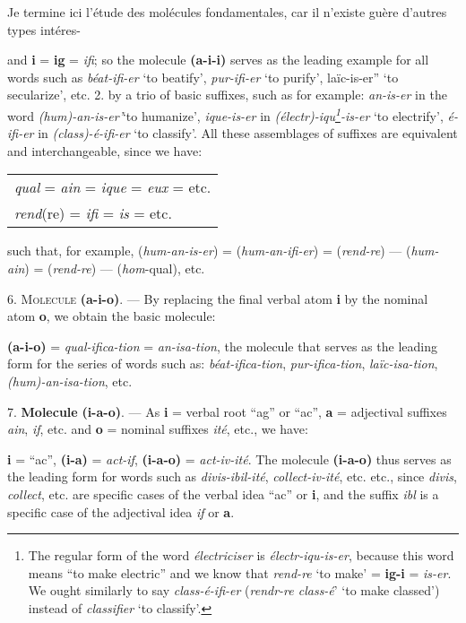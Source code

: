\begin{sloppypar}
{  Je termine ici l’étude des molécules fondamentales, car il n’existe
  guère d’autres types intéres- }
%
{\noindent
  {\small
    and \textbf{i} = \textbf{ig} = \emph{ifi}; so the molecule
    \textbf{(a-i-i)} serves as the leading example for all words such
    as \emph{béat-ifi-er} `to beatify', \emph{pur-ifi-er} `to purify',
    laïc-is-er'' `to secularize', etc. 2. by a trio of basic
    suffixes, such as for example: \emph{an-is-er} in the word
    \emph{(hum)-an-is-er'}`to humanize', \emph{ique-is-er} in
    \emph{(électr)-iqu\footnote{The regular form of the word
      \emph{électriciser} is \emph{électr-iqu-is-er}, because this word
      means ``to make electric'' and we know that \emph{rend-re} `to
      make' = \textbf{ig-i} = \emph{is-er}. We ought similarly to say
      \emph{class-é-ifi-er} (\emph{rendr-re class-é}' `to make classed')
      instead of \emph{classifier} `to classify'.}-is-er} `to
    electrify', \emph{é-ifi-er} in \emph{(class)-é-ifi-er} `to
    classify'. All these assemblages of suffixes are equivalent and
    interchangeable, since we have:

    \begin{center}
      \begin{tabular}[t]{l}
        \emph{qual} = \emph{ain} = \emph{ique} = \emph{eux} = etc. \\
        \emph{rend}(re) = \emph{ifi} = \emph{is} = etc.
      \end{tabular}
    \end{center}
    such that, for example, (\emph{hum-an-is-er}) =
    (\emph{hum-an-ifi-er}) = (\emph{rend-re}) — (\emph{hum-ain}) =
    (\emph{rend-re}) — (\emph{hom}-qual), etc.

    6. \textsc{Molecule} \textbf{(a-i-o)}. — By replacing the final
    verbal atom \textbf{i} by the nominal atom \textbf{o}, we obtain
    the basic molecule:

    \textbf{(a-i-o) }= \emph{qual-ifica-tion} = \emph{an-isa-tion}, the
    molecule that serves as the leading form for the series of words
    such as: \emph{béat-ifica-tion}, \emph{pur-ifica-tion},
    \emph{laïc-isa-tion}, \emph{(hum)-an-isa-tion}, etc.

    7. \textbf{Molecule} \textbf{(i-a-o)}. — As \textbf{i} = verbal
    root ``ag'' or ``ac'', \textbf{a} = adjectival suffixes \emph{ain},
    \emph{if}, etc. and \textbf{o} = nominal suffixes \emph{ité}, etc., we
    have:

    \textbf{i} = ``ac'', \textbf{(i-a)} = \emph{act-if},
    \textbf{(i-a-o)} = \emph{act-iv-ité}.  The molecule
    \textbf{(i-a-o)} thus serves as the leading form for words such as
    \emph{divis-ibil-ité}, \emph{collect-iv-ité}, etc. etc., since
    \emph{divis}, \emph{collect}, etc. are specific cases of the
    verbal idea ``ac'' or \textbf{i}, and the suffix \emph{ibl} is a
    specific case of the adjectival idea \emph{if} or \textbf{a}.  }

}
\end{sloppypar}
